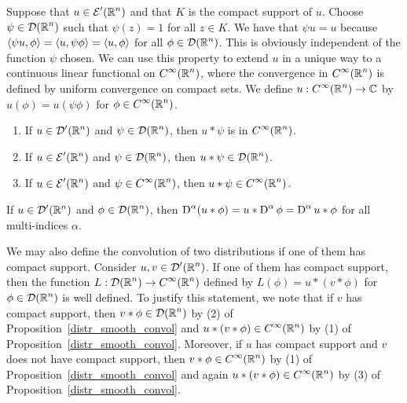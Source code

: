 Suppose that $\displaystyle u \in \mathcal{E}'(\mathbb{R}^n)$ and that $K$ is the
compact support of $u$.  Choose $\displaystyle \psi \in \mathcal{D}(\mathbb{R}^n)$
such that $\psi(z) =1$ for all $z \in K$.  We have that $\psi u = u$ because
$\left\langle{\psi u} , {\phi}\right\rangle = \left\langle{u} , {\psi \phi}\right\rangle = \left\langle{u} , {\phi}\right\rangle$ for all
$\displaystyle \phi \in \mathcal{D}(\mathbb{R}^n)$.  This is obviously independent of
the function $\psi$ chosen.  We can use this property to extend $u$ in a
unique way to a continuous linear functional on
$\displaystyle C^\infty(\mathbb{R}^n)$,
where the convergence in $\displaystyle C^\infty(\mathbb{R}^n)$ is defined by uniform
convergence on compact sets.  We define
$\displaystyle u:C^\infty(\mathbb{R}^n) \to \mathbb{C}$ by
$u(\phi) = u(\psi \phi)$ for $\displaystyle \phi \in C^\infty(\mathbb{R}^n)$.

\begin{prop} \label{distr_smooth_convol}
\begin{enumerate}
\item If $\displaystyle u\in \mathcal{D}'(\mathbb{R}^n)$ and
$\displaystyle \psi\in \mathcal{D}(\mathbb{R}^n)$, then $u\ast \psi$
is in $\displaystyle C^\infty(\mathbb{R}^n)$.
\item If $\displaystyle u\in \mathcal{E}'(\mathbb{R}^n)$ and
$\displaystyle \psi\in \mathcal{D}(\mathbb{R}^n)$, then
$\displaystyle u \ast \psi \in \mathcal{D}(\mathbb{R}^n)$.
\item If $\displaystyle u\in \mathcal{E}'(\mathbb{R}^n)$ and
$\displaystyle \psi\in C^\infty(\mathbb{R}^n)$, then
$\displaystyle u \ast \psi \in C^\infty(\mathbb{R}^n)$.
\end{enumerate}
\end{prop}

\begin{prop} \label{distr_comm_der}
If $\displaystyle u\in \mathcal{D}'(\mathbb{R}^n)$ and
$\displaystyle \phi\in \mathcal{D}(\mathbb{R}^n)$, then
$\displaystyle \operatorname{D}^\alpha(u\ast \phi)
= u \ast \operatorname{D}^\alpha \phi = \operatorname{D}^\alpha u \ast \phi$
for all multi-indices $\alpha$.
\end{prop}

We may also define the convolution of two distributions if one of them
has compact support.  Consider $\displaystyle u,v \in \mathcal{D}'(\mathbb{R}^n)$.
If one of them has compact support, then the function
$\displaystyle L: \mathcal{D}(\mathbb{R}^n) \to C^\infty(\mathbb{R}^n)$
defined by $\displaystyle L(\phi) = u \ast (v \ast \phi)$ for
$\displaystyle \phi \in \mathcal{D}(\mathbb{R}^n)$ is well defined.  To justify this
statement, we note that if $v$ has compact support, then
$\displaystyle v \ast \phi \in \mathcal{D}(\mathbb{R}^n)$
by (2) of Proposition~\ref{distr_smooth_convol} and
$\displaystyle u \ast (v \ast \phi) \in C^\infty(\mathbb{R}^n)$ by (1) of
Proposition~\ref{distr_smooth_convol}.  Moreover, if $u$ has compact
support and $v$ does not have compact support, then
$\displaystyle v \ast \phi \in C^\infty(\mathbb{R}^n)$ by (1) of
Proposition~\ref{distr_smooth_convol} and again 
$\displaystyle u \ast (v \ast \phi) \in C^\infty(\mathbb{R}^n)$ by (3) of
Proposition~\ref{distr_smooth_convol}.

